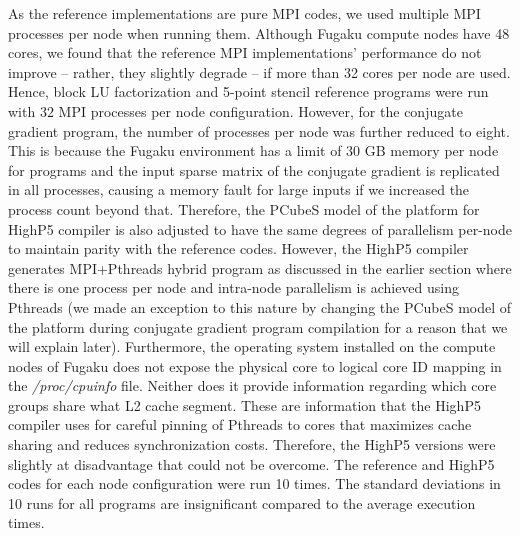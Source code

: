 \documentclass[ASNA,twocolumn]{USG} %
\begin{document}
{As the reference implementations are pure MPI codes, we used multiple MPI processes per node when running them. Although Fugaku compute nodes have 48 cores, we found that the reference MPI implementations' performance do not improve -- rather, they slightly degrade -- if more than 32 cores per node are used. Hence, block LU factorization and 5-point stencil reference programs were run with $32$ MPI processes per node configuration. However, for the conjugate gradient program, the number of processes per node was further reduced to eight. This is because the Fugaku environment has a limit of $30$ GB memory per node for programs and the input sparse matrix of the conjugate gradient is replicated in all processes, causing a memory fault for large inputs if we increased the process count beyond that. Therefore, the PCubeS model of the platform for HighP5 compiler is also adjusted to have the same degrees of parallelism per-node to maintain parity with the reference codes. However, the HighP5 compiler generates MPI+Pthreads hybrid program as discussed in the earlier section where there is one process per node and intra-node parallelism is achieved using Pthreads (we made an exception to this nature by changing the PCubeS model of the platform during conjugate gradient program compilation for a reason that we will explain later). Furthermore, the operating system installed on the compute nodes of Fugaku does not expose the physical core to logical core ID mapping in the \textit{/proc/cpuinfo} file. Neither does it provide information regarding which core groups share what L2 cache segment. These are information that the HighP5 compiler uses for careful pinning of Pthreads to cores that maximizes cache sharing and reduces synchronization costs. Therefore, the HighP5 versions were slightly at disadvantage that could not be overcome. The reference and HighP5 codes for each node configuration were run 10 times. The standard deviations in 10 runs for all programs are insignificant compared to the average execution times.  

}
\end{document}
